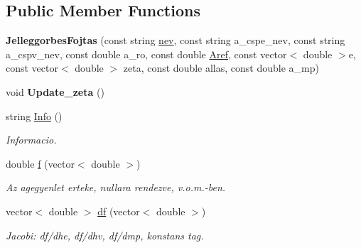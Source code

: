 \subsection*{Public Member Functions}
\begin{DoxyCompactItemize}
\item 
\mbox{\label{class_jelleggorbes_fojtas_af66a653a2838a2a5a9669ecfd7dc6a0b}} 
{\bfseries Jelleggorbes\+Fojtas} (const string \hyperlink{class_agelem_abe92b7e3912367d5d1caf6b277ca0b7d}{nev}, const string a\+\_\+cspe\+\_\+nev, const string a\+\_\+cspv\+\_\+nev, const double a\+\_\+ro, const double \hyperlink{class_agelem_a3f8668febc2958fd539997d537552f17}{Aref}, const vector$<$ double $>$e, const vector$<$ double $>$ zeta, const double allas, const double a\+\_\+mp)
\item 
\mbox{\label{class_jelleggorbes_fojtas_a8ac49ed546134b5147796be94b22521a}} 
void {\bfseries Update\+\_\+zeta} ()
\item 
\mbox{\label{class_jelleggorbes_fojtas_a86d24b2271e234200a7ecbdccd4e94c1}} 
string \hyperlink{class_jelleggorbes_fojtas_a86d24b2271e234200a7ecbdccd4e94c1}{Info} ()
\begin{DoxyCompactList}\small\item\em Informacio. \end{DoxyCompactList}\item 
\mbox{\label{class_jelleggorbes_fojtas_a86bd9df0aa43f56c29dd451c92368724}} 
double \hyperlink{class_jelleggorbes_fojtas_a86bd9df0aa43f56c29dd451c92368724}{f} (vector$<$ double $>$)
\begin{DoxyCompactList}\small\item\em Az agegyenlet erteke, nullara rendezve, v.\+o.\+m.-\/ben. \end{DoxyCompactList}\item 
\mbox{\label{class_jelleggorbes_fojtas_a4962bb9e88d9f4c6453f1e57ae3c2041}} 
vector$<$ double $>$ \hyperlink{class_jelleggorbes_fojtas_a4962bb9e88d9f4c6453f1e57ae3c2041}{df} (vector$<$ double $>$)
\begin{DoxyCompactList}\small\item\em Jacobi\+: df/dhe, df/dhv, df/dmp, konstans tag. \end{DoxyCompactList}\item 

\end{DoxyCompactItemize}
